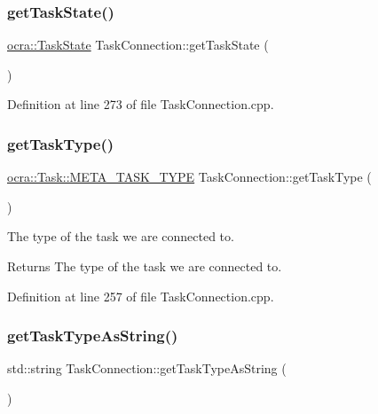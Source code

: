 \subsubsection{\texorpdfstring{get\+Task\+State()}{getTaskState()}}
{\footnotesize\ttfamily \hyperlink{classocra_1_1TaskState}{ocra\+::\+Task\+State} Task\+Connection\+::get\+Task\+State (\begin{DoxyParamCaption}{ }\end{DoxyParamCaption})}



Definition at line 273 of file Task\+Connection.\+cpp.

\hypertarget{classocra__recipes_1_1TaskConnection_ac5a29440c295728f97b5a5f6df69924f}{}\label{classocra__recipes_1_1TaskConnection_ac5a29440c295728f97b5a5f6df69924f} 
\subsubsection{\texorpdfstring{get\+Task\+Type()}{getTaskType()}}
{\footnotesize\ttfamily \hyperlink{classocra_1_1Task_a8ddf2840d178ca273e886c9ca95248fe}{ocra\+::\+Task\+::\+M\+E\+T\+A\+\_\+\+T\+A\+S\+K\+\_\+\+T\+Y\+PE} Task\+Connection\+::get\+Task\+Type (\begin{DoxyParamCaption}{ }\end{DoxyParamCaption})}

The type of the task we are connected to.

\begin{DoxyReturn}{Returns}
The type of the task we are connected to. 
\end{DoxyReturn}


Definition at line 257 of file Task\+Connection.\+cpp.

\hypertarget{classocra__recipes_1_1TaskConnection_aab1504531e1371df092a8c589b100e1c}{}\label{classocra__recipes_1_1TaskConnection_aab1504531e1371df092a8c589b100e1c} 
\subsubsection{\texorpdfstring{get\+Task\+Type\+As\+String()}{getTaskTypeAsString()}}
{\footnotesize\ttfamily std\+::string Task\+Connection\+::get\+Task\+Type\+As\+String (\begin{DoxyParamCaption}{ }\end{DoxyParamCaption})}



